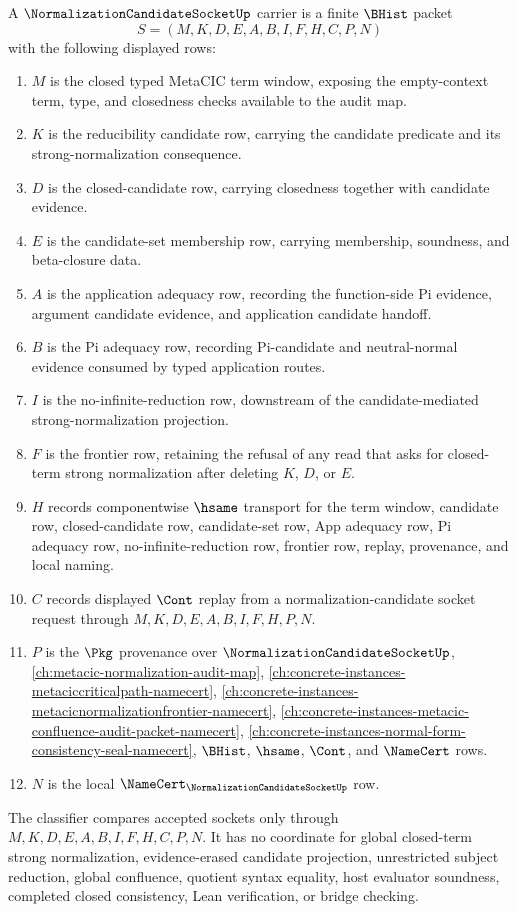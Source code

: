 \begin{definition}
\label{def:normalization-candidate-socket-carrier}
A $\NormalizationCandidateSocketUp$ carrier is a finite $\BHist$ packet
$$
S=(M,K,D,E,A,B,I,F,H,C,P,N)
$$
with the following displayed rows:
\begin{enumerate}
\item $M$ is the closed typed MetaCIC term window, exposing the empty-context term, type, and closedness checks available to the audit map.
\item $K$ is the reducibility candidate row, carrying the candidate predicate and its strong-normalization consequence.
\item $D$ is the closed-candidate row, carrying closedness together with candidate evidence.
\item $E$ is the candidate-set membership row, carrying membership, soundness, and beta-closure data.
\item $A$ is the application adequacy row, recording the function-side Pi evidence, argument candidate evidence, and application candidate handoff.
\item $B$ is the Pi adequacy row, recording Pi-candidate and neutral-normal evidence consumed by typed application routes.
\item $I$ is the no-infinite-reduction row, downstream of the candidate-mediated strong-normalization projection.
\item $F$ is the frontier row, retaining the refusal of any read that asks for closed-term strong normalization after deleting $K$, $D$, or $E$.
\item $H$ records componentwise $\hsame$ transport for the term window, candidate row, closed-candidate row, candidate-set row, App adequacy row, Pi adequacy row, no-infinite-reduction row, frontier row, replay, provenance, and local naming.
\item $C$ records displayed $\Cont$ replay from a normalization-candidate socket request through $M,K,D,E,A,B,I,F,H,P,N$.
\item $P$ is the $\Pkg$ provenance over $\NormalizationCandidateSocketUp$, \autoref{ch:metacic-normalization-audit-map}, \autoref{ch:concrete-instances-metaciccriticalpath-namecert}, \autoref{ch:concrete-instances-metacicnormalizationfrontier-namecert}, \autoref{ch:concrete-instances-metacic-confluence-audit-packet-namecert}, \autoref{ch:concrete-instances-normal-form-consistency-seal-namecert}, $\BHist$, $\hsame$, $\Cont$, and $\NameCert$ rows.
\item $N$ is the local $\NameCert_{\NormalizationCandidateSocketUp}$ row.
\end{enumerate}
The classifier compares accepted sockets only through $M,K,D,E,A,B,I,F,H,C,P,N$. It has no coordinate for global closed-term strong normalization, evidence-erased candidate projection, unrestricted subject reduction, global confluence, quotient syntax equality, host evaluator soundness, completed closed consistency, Lean verification, or bridge checking.
\end{definition}


